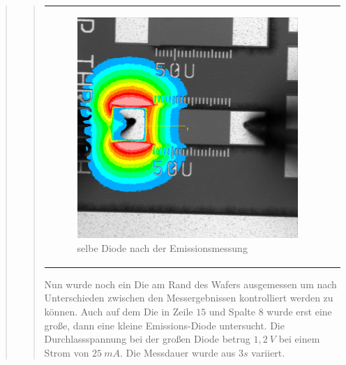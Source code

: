 \begin{quote}
\begin{quote}
\begin{center}
\begin{tabular}{ll}
\begin{minipage}{0.6\textwidth}
                         \begin{figure}[H]
                            \label{fig:asdfasdfasdfggg}
                            \includegraphics[scale=0.25, trim = 0cm 0cm 0cm
                            0cm,
                            clip]{./Emissionsbilder/zwei/nach_Emissionsmessung_Intensitat_Distanz.jpg}
                            \caption{selbe Diode nach der Emissionsmessung}
                        \end{figure}
                   \vspace{-1.5em}

                    \end{minipage}

                \end{tabular}
                \end{center}

        \vspace{2em}

        Nun wurde noch ein Die am Rand des Wafers ausgemessen um nach
        Unterschieden zwischen den Messergebnissen kontrolliert werden zu
        können. Auch auf dem Die in Zeile $15$ und Spalte $8$ wurde erst eine
        große, dann eine kleine Emissions-Diode untersucht. Die Durchlassspannung bei der
        großen Diode betrug $1,2\ V$ bei einem Strom von $25\ mA$. Die Messdauer
        wurde aus $3s$ variiert.



\end{quote}
\end{quote}
